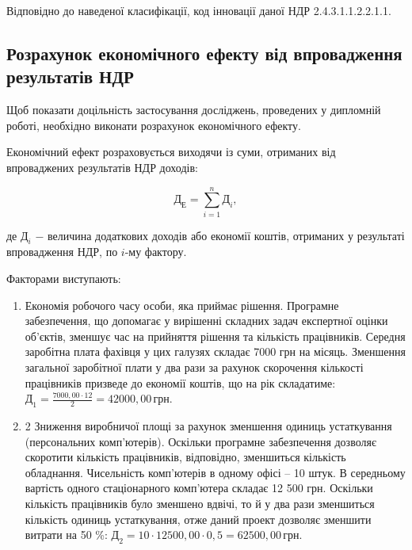 Відповідно до наведеної класифікації, код інновації даної НДР 2.4.3.1.1.2.2.1.1.

\subsection{Розрахунок економічного ефекту від впровадження результатів НДР}

Щоб показати доцільність застосування досліджень, проведених у дипломній роботі, необхідно виконати розрахунок економічного ефекту.

Економічний ефект розраховується виходячи із суми, отриманих від впроваджених результатів НДР доходів: 

\begin{equation}\label{eq:economy11}
	\text{Д}_{\text{Е}} = \sum_{i=1}^{n}\text{Д}_{i},
\end{equation}

\noindent де $\text{Д}_{i}$ $-$ величина додаткових доходів або економії коштів, отриманих у результаті впровадження НДР, по $i$-му фактору. 

\vspace{1.5em}

Факторами виступають:

\begin{enumerate}
	\item Економія робочого часу особи, яка приймає рішення. Програмне забезпечення, що допомагає у вирішенні складних задач експертної оцінки об’єктів, зменшує час на прийняття рішення та кількість працівників. Середня заробітна плата фахівця у цих галузях складає 7000 грн на місяць. Зменшення загальної заробітної плати у два рази за рахунок скорочення кількості працівників призведе до економії коштів, що на рік складатиме: $\text{Д}_{1} = \frac{7000,00 \cdot 12}{2} = 42000,00 \, \text{грн}$.
	\item 2	Зниження виробничої площі за рахунок зменшення одиниць устаткування (персональних комп’ютерів). Оскільки програмне забезпечення дозволяє скоротити кількість працівників, відповідно, зменшиться кількість обладнання. Чисельність комп’ютерів в одному офісі – 10 штук. В середньому вартість одного стаціонарного комп’ютера складає 12 500 грн. Оскільки кількість працівників було зменшено вдвічі, то й у два рази зменшиться кількість одиниць устаткування, отже даний проект дозволяє зменшити витрати на 50 \%: $\text{Д}_{2} = 10 \cdot 12500,00 \cdot 0,5 = 62500,00 \, \text{грн}$.
\end{enumerate}

